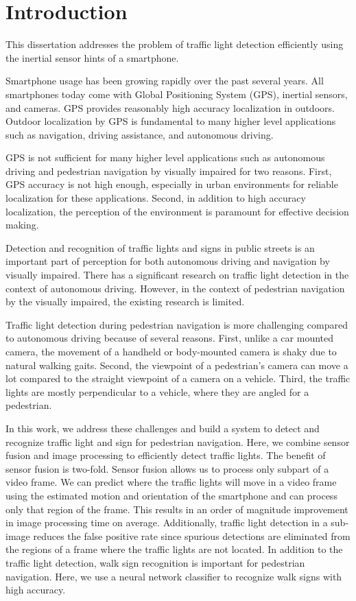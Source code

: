 \chapter{Introduction}

This dissertation addresses the problem of traffic light detection efficiently using the inertial sensor hints of a smartphone.

Smartphone usage has been growing rapidly over the past several years. 
All smartphones today come with Global Positioning System (GPS), inertial sensors, and cameras. 
GPS provides reasonably high accuracy localization in outdoors. 
Outdoor localization by GPS is fundamental to many higher level applications such as navigation, driving assistance, and autonomous driving.

GPS is not sufficient for many higher level applications such as autonomous driving and pedestrian navigation by visually impaired for two reasons.
First, GPS accuracy is not high enough, especially in urban environments for reliable localization for these applications. 
Second, in addition to high accuracy localization, the perception of the environment is paramount for effective decision making. 

Detection and recognition of traffic lights and signs in public streets is an important part of perception for both autonomous driving and navigation by visually impaired.  
There has a significant research \cite{traffic_google} on traffic light detection in the context of autonomous driving. 
However, in the context of pedestrian navigation by the visually impaired, the existing research is limited. 

Traffic light detection during pedestrian navigation is more challenging compared to autonomous driving because of several reasons. 
First, unlike a car mounted camera, the movement of a handheld or body-mounted camera is shaky due to natural walking gaits. 
Second, the viewpoint of a pedestrian's camera can move a lot compared to the straight viewpoint of a camera on a vehicle.
Third, the traffic lights are mostly perpendicular to a vehicle, where they are angled for a pedestrian. 

In this work, we address these challenges and build a system to detect and recognize traffic light and sign for pedestrian navigation.
Here, we combine sensor fusion and image processing to efficiently detect traffic lights. 
The benefit of sensor fusion is two-fold.
Sensor fusion allows us to process only subpart of a video frame.
We can predict where the traffic lights will move in a video frame using the estimated motion and orientation of the smartphone and can process only that region of the frame. 
This results in an order of magnitude improvement in image processing time on average. 
Additionally, traffic light detection in a sub-image reduces the false positive rate since spurious detections are eliminated from the regions of a frame where the traffic lights are not located.
In addition to the traffic light detection, walk sign recognition is important for pedestrian navigation.
Here, we use a neural network classifier to recognize walk signs with high accuracy. 

